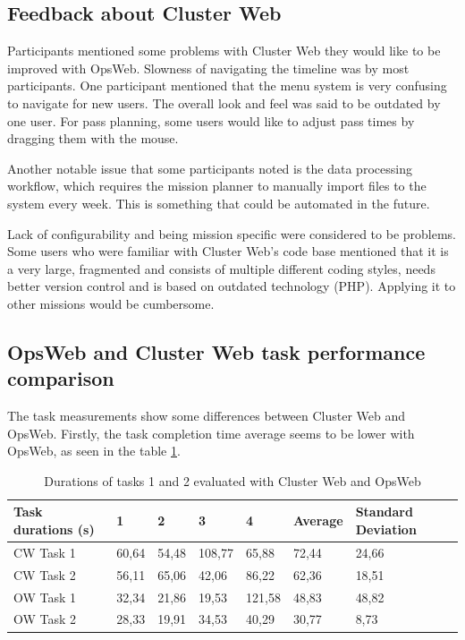 \subsection{Feedback about Cluster Web}
Participants mentioned some problems with Cluster Web they would like to be improved with OpsWeb. Slowness of navigating the timeline was by most participants. One participant mentioned that the menu system is very confusing to navigate for new users. The overall look and feel was said to be outdated by one user. For pass planning, some users would like to adjust pass times by dragging them with the mouse.

Another notable issue that some participants noted is the data processing workflow, which requires the mission planner to manually import files to the system every week. This is something that could be automated in the future. 

Lack of configurability and being mission specific were considered to be problems. Some users who were familiar with Cluster Web's code base mentioned that it is a very large, fragmented and consists of multiple different coding styles, needs better version control and is based on outdated technology (PHP). Applying it to other missions would be cumbersome.

\subsection{OpsWeb and Cluster Web task performance comparison} \label{cw_ow_task_perf}
The task measurements show some differences between Cluster Web and OpsWeb. Firstly, the task completion time average seems to be lower with OpsWeb, as seen in the table \ref{cw_ow_times}.

\begin{table}[!ht]
\def\arraystretch{1.1}%
    \begin{center}
    \caption{Durations of tasks 1 and 2 evaluated with Cluster Web and OpsWeb}
    \label{cw_ow_times}
    \begin{tabular}{| l | l | l | l | l | l | l | }
    \hline
    Task durations (s) & 1     & 2     & 3      & 4      & Average & Standard Deviation \\
    \hline
    CW Task 1            & 60,64 & 54,48 & 108,77 & 65,88  & 72,44   & 24,66              \\
    CW Task 2            & 56,11 & 65,06 & 42,06  & 86,22  & 62,36   & 18,51              \\
    OW Task 1            & 32,34 & 21,86 & 19,53  & 121,58 & 48,83   & 48,82              \\
    OW Task 2            & 28,33 & 19,91 & 34,53  & 40,29  & 30,77   & 8,73              \\
    \hline
    \end{tabular}
    \end{center}
\end{table}

